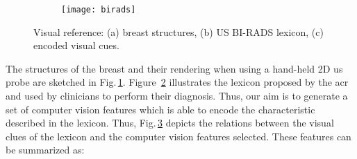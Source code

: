 \begin{figure}
    \centering
    \begin{subfigure}[b]{0.30\textwidth}
        \centering
        \label{fig:features:breast}
    \end{subfigure}
    \hfill
    \begin{subfigure}[b]{0.34\textwidth}   
        \centering 
        \texttt{[image: birads]}
        \label{fig:features:lexicon}
    \end{subfigure}
    \hfill
    \begin{subfigure}[b]{0.2\textwidth}
      \newcommand{\insertVisualCue}[2]{
        \tikz{\node[label=above:#2]{\texttt{[image: \#1]}};}
      }
      \centering
      \begin{tiny}
        \insertVisualCue{AppearanceCues}{Appearance}
        \vfill
        \insertVisualCue{AtlasCues}{{Atlas, Brightness}}
        \vfill
        \insertVisualCue{siftCues}{SIFT-BoF}
      \end{tiny}
      \label{fig:features:relation}
    \end{subfigure}
    \hfill
    \caption {{\footnotesize Visual reference: (a) breast structures, (b) US BI-RADS lexicon, (c) encoded visual cues.}} 
    \label{fig:features}
\end{figure}

The structures of the breast and their rendering when using a hand-held 2D \ac{us} probe are sketched in Fig.\,\ref{fig:features:breast}. Figure~\ref{fig:features:lexicon} illustrates the lexicon proposed by the \ac{acr}~\cite{biradsus} and used by clinicians to perform their diagnosis. Thus, our aim is to generate a set of computer vision features which is able to encode the characteristic described in the lexicon. Thus, Fig.\,\ref{fig:features:relation} depicts the relations between the visual clues of the lexicon and the computer vision features selected. These features can be summarized as:

